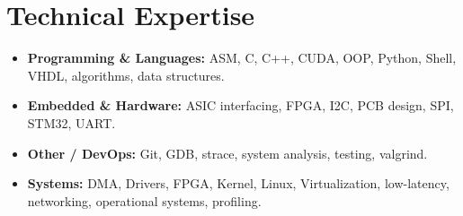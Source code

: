 \documentclass[9pt,a4paper]{article}
\begin{document}
\section*{Technical Expertise}
\begin{tcolorbox}[mybox]
\begin{itemize}
\item \textbf{Programming \& Languages:} ASM, C, C++, CUDA, OOP, Python, Shell, VHDL, algorithms, data structures.

\item \textbf{Embedded \& Hardware:} ASIC interfacing, FPGA, I2C, PCB design, SPI, STM32, UART.

\item \textbf{Other / DevOps:} Git, GDB, strace, system analysis, testing, valgrind.

\item \textbf{Systems:} DMA, Drivers, FPGA, Kernel, Linux, Virtualization, low-latency, networking, operational systems, profiling.
\end{itemize}
\end{tcolorbox}
\end{document}
